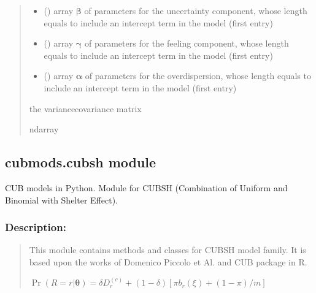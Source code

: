 \documentclass[letterpaper,10pt,english]{sphinxmanual}
\begin{document}
\begin{fulllineitems}
\begin{quote}
\begin{description}
\begin{itemize}
\item {} 
\sphinxAtStartPar
{} () \textendash{} array \(\pmb \beta\) of parameters for the uncertainty component, whose length equals 
 to include an intercept term in the model (first entry)

\item {} 
\sphinxAtStartPar
{} () \textendash{} array \(\pmb \gamma\) of parameters for the feeling component, whose length equals 
 to include an intercept term in the model (first entry)

\item {} 
\sphinxAtStartPar
{} () \textendash{} array \(\pmb \alpha\) of parameters for the overdispersion, whose length equals 
 to include an intercept term in the model (first entry)

\end{itemize}

\sphinxAtStartPar
the variance\sphinxhyphen{}covariance matrix

\sphinxAtStartPar
ndarray

\end{description}\end{quote}

\end{fulllineitems}



\subsection{cubmods.cubsh module}
\label{\detokenize{cubmods:module-cubmods.cubsh}}\label{\detokenize{cubmods:cubmods-cubsh-module}}
\sphinxAtStartPar
CUB models in Python.
Module for CUBSH (Combination of Uniform
and Binomial with Shelter Effect).


\subsubsection{Description:}
\label{\detokenize{cubmods:id105}}\begin{quote}

\sphinxAtStartPar
This module contains methods and classes
for CUBSH model family.
It is based upon the works of Domenico
Piccolo et Al. and CUB package in R.

\sphinxAtStartPar
\(\Pr(R=r|\pmb\theta) = \delta D_r^{(c)} + (1 - \delta)[ \pi b_r(\xi) + (1-\pi)/m ]\)
\end{quote}
\end{document}
